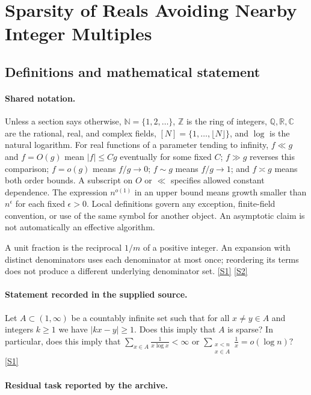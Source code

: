 \documentclass[11pt,a4paper]{article}
\newcommand{\N}{\mathbb{N}}
\newcommand{\Z}{\mathbb{Z}}
\newcommand{\Q}{\mathbb{Q}}
\newcommand{\R}{\mathbb{R}}
\newcommand{\C}{\mathbb{C}}
\newcommand{\sref}[2]{\hyperlink{source:#1:#2}{[S#2]}}
\begin{document}
\section{Sparsity of Reals Avoiding Nearby Integer Multiples}\label{statement}


\subsection{Definitions and mathematical statement}

\paragraph{Shared notation.}Unless a section says otherwise, $\N=\{1,2,\ldots\}$,
$\Z$ is the ring of integers, $\Q,\R,\C$ are the rational, real, and complex
fields, $[N]=\{1,\ldots,\lfloor N\rfloor\}$, and $\log$ is the natural
logarithm. For real functions of a parameter tending to infinity,
$f\ll g$ and $f=O(g)$ mean $|f|\leq Cg$ eventually for some fixed $C$;
$f\gg g$ reverses this comparison; $f=o(g)$ means $f/g\to0$;
$f\sim g$ means $f/g\to1$; and $f\asymp g$ means both order bounds.
A subscript on $O$ or $\ll$ specifies allowed constant dependence.
The expression $n^{o(1)}$ in an upper bound means growth smaller than
$n^\epsilon$ for each fixed $\epsilon>0$. Local definitions govern any
exception, finite-field convention, or use of the same symbol for another
object. An asymptotic claim is not automatically an effective algorithm.



A unit fraction is the reciprocal $1/m$ of a positive integer. An expansion with distinct denominators uses each denominator at most once; reordering its terms does not produce a different underlying denominator set. \sref{statement}{1} \sref{statement}{2}

\paragraph{Statement recorded in the supplied source.}
Let $A\subset (1,\infty)$ be a countably infinite set such that for all $x\neq y\in A$ and integers $k\geq 1$ we have $  \lvert kx -y\rvert \geq 1. $ Does this imply that $A$ is sparse? In particular, does this imply that $ \sum_{x\in A}\frac{1}{x\log x}<\infty $ or $ \sum_{\substack{x <n\\ x\in A}}\frac{1}{x}=o(\log n)? $ \sref{statement}{1}

\paragraph{Residual task reported by the archive.}
\end{document}
